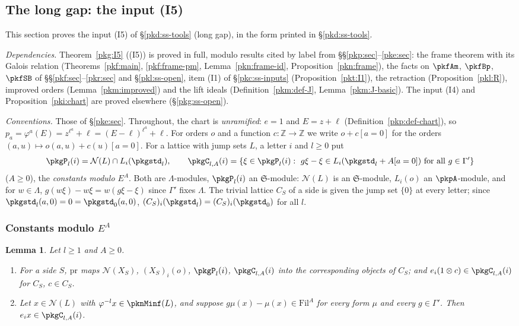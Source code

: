 \documentclass[10pt]{amsart}
\newtheorem{lemma}[theorem]{Lemma}
\theoremstyle{definition}
\theoremstyle{remark}
\newcommand{\Z}{\mathbb Z}
\begin{document}
\subsection{The long gap: the input (I5)}\label{pkg:sec}

This section proves the input (I5) of \S\ref{pkd:ss-tools} (long gap), in the form printed in
\S\ref{pkd:ss-tools}.

\emph{Dependencies.} Theorem~\ref{pkg:I5} ((I5)) is proved in full, modulo results cited by label from
\S\S\ref{pkp:sec}--\ref{pke:sec}: the frame theorem with its Galois relation
(Theorems~\ref{pkf:main}, \ref{pkf:frame-pm}, Lemma~\ref{pkn:frame-id}, Proposition~\ref{pkn:frame}),
the facts on $\pkfAm$, $\pkfBp$, $\pkfSB$ of \S\S\ref{pkf:sec}--\ref{pkr:sec} and \S\ref{pkl:ss-open},
item (I1) of \S\ref{pkc:ss-inputs} (Proposition~\ref{pkt:I1}), the retraction (Proposition~\ref{pkl:R}),
improved orders (Lemma~\ref{pkm:improved}) and the lift ideals (Definition~\ref{pkm:def-J},
Lemma~\ref{pkm:J-basic}). The input (I4) and Proposition~\ref{pki:chart} are proved elsewhere
(\S\ref{pkg:ss-open}).

\emph{Conventions.} Those of \S\ref{pke:sec}. Throughout, the chart is \emph{unramified}: $e=1$ and
$E=z+\ell$ (Definition~\ref{pkp:def-chart}), so $p_a=\varphi^a(E)=z^{\ell^a}+\ell=(E-\ell)^{\ell^a}+\ell$.
For orders $o$ and a function $c\colon\Z\to\Z$ we write $o+c[a=0]$ for the orders
$(a,u)\mapsto o(a,u)+c(u)[a=0]$. For a lattice with jump sets $L$, a letter $i$ and $l\ge0$ put
\[
\pkgP_l(i)=\mathcal N(L)\cap L_i(\pkgstd_l),\qquad
\pkgC_{l,A}(i)=\{\xi\in\pkgP_l(i):\ g\xi-\xi\in L_i(\pkgstd_l+A[a=0])\ \text{for all }g\in\Gamma'\}
\]
($A\ge0$), the \emph{constants modulo $E^A$}. Both are $\Lambda$-modules, $\pkgP_l(i)$ an
$\mathfrak S$-module: $\mathcal N(L)$ is an $\mathfrak S$-module, $L_i(o)$ an $\pkpA$-module, and for
$w\in\Lambda$, $g(w\xi)-w\xi=w(g\xi-\xi)$ since $\Gamma'$ fixes $\Lambda$. The trivial lattice $C_S$ of a
side is given the jump set $\{0\}$ at every letter; since $\pkgstd_l(a,0)=0=\pkgstd_0(a,0)$,
$(C_S)_i(\pkgstd_l)=(C_S)_i(\pkgstd_0)$ for all $l$.

\subsubsection{Constants modulo $E^A$}\label{pkg:ss-const}

\begin{lemma}\label{pkg:const}
Let $l\ge1$ and $A\ge0$.
\begin{enumerate}
\item[(i)] For a side $S$, $\mathrm{pr}$ maps $\mathcal N(X_S)$, $(X_S)_i(o)$, $\pkgP_l(i)$, $\pkgC_{l,A}(i)$
into the corresponding objects of $C_S$; and $e_i(1\otimes c)\in\pkgC_{l,A}(i)$ for $C_S$, $c\in C_S$.
\item[(ii)] Let $x\in\mathcal N(L)$ with $\varphi^{-l}x\in\pknMinf(L)$, and suppose $g\mu(x)-\mu(x)\in
\mathrm{Fil}^A$ for every form $\mu$ and every $g\in\Gamma'$. Then $e_ix\in\pkgC_{l,A}(i)$.
\end{enumerate}
\end{lemma}
\end{document}

